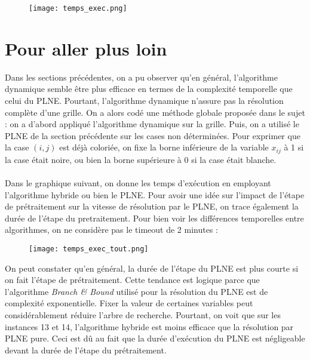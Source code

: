 \documentclass[10pt,a4paper]{article}
\begin{document}
\begin{figure}[H]
\texttt{[image: temps\_exec.png]}
\end{figure} 


\section{Pour aller plus loin}
\noindent
Dans les sections précédentes, on a pu observer qu'en général, l'algorithme dynamique semble être plus efficace en termes de la complexité temporelle que celui du PLNE. Pourtant, l'algorithme dynamique n'assure pas la résolution complète d'une grille. On a alors codé une méthode globale proposée dans le sujet : on a d'abord appliqué l'algorithme dynamique sur la grille. Puis, on a utilisé le PLNE de la section précédente sur les cases non déterminées. Pour exprimer que la case $(i,j)$ est déjà coloriée, on fixe la borne inférieure de la variable $x_{ij}$ à 1 si la case était noire, ou bien la borne supérieure à 0 si la case était blanche. \\ \\
\noindent
Dans le graphique suivant, on donne les temps d'exécution en employant l'algorithme hybride ou bien le PLNE. Pour avoir une idée sur l'impact de l'étape de prétraitement sur la vitesse de résolution par le PLNE, on trace également la durée de l'étape du pretraitement. Pour bien voir les différences temporelles entre algorithmes, on ne considère pas le timeout de 2 minutes : \\ 

\begin{figure}[H]
\texttt{[image: temps\_exec\_tout.png]}
\end{figure}
\noindent
On peut constater qu'en général, la durée de l'étape du PLNE est plus courte si on fait l'étape de prétraitement. Cette tendance est logique parce que l'algorithme \textit{Branch \& Bound} utilisé pour la résolution du PLNE est de complexité exponentielle. Fixer la valeur de certaines variables peut considérablement réduire l'arbre de recherche. Pourtant, on voit que sur les instances 13 et 14, l'algorithme hybride est moins efficace que la résolution par PLNE pure. Ceci est dû au fait que la durée d'exécution du PLNE est négligeable devant la durée de l'étape du prétraitement. \\ \\
\noindent
\end{document}
